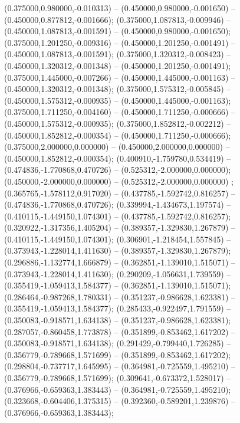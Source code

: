  (0.375000,0.980000,-0.010313) -- (0.450000,0.980000,-0.001650) -- (0.450000,0.877812,-0.001666);
 (0.375000,1.087813,-0.009946) -- (0.450000,1.087813,-0.001591) -- (0.450000,0.980000,-0.001650);
 (0.375000,1.201250,-0.009316) -- (0.450000,1.201250,-0.001491) -- (0.450000,1.087813,-0.001591);
 (0.375000,1.320312,-0.008423) -- (0.450000,1.320312,-0.001348) -- (0.450000,1.201250,-0.001491);
 (0.375000,1.445000,-0.007266) -- (0.450000,1.445000,-0.001163) -- (0.450000,1.320312,-0.001348);
 (0.375000,1.575312,-0.005845) -- (0.450000,1.575312,-0.000935) -- (0.450000,1.445000,-0.001163);
 (0.375000,1.711250,-0.004160) -- (0.450000,1.711250,-0.000666) -- (0.450000,1.575312,-0.000935);
 (0.375000,1.852812,-0.002212) -- (0.450000,1.852812,-0.000354) -- (0.450000,1.711250,-0.000666);
 (0.375000,2.000000,0.000000) -- (0.450000,2.000000,0.000000) -- (0.450000,1.852812,-0.000354);
 (0.400910,-1.759780,0.534419) -- (0.474836,-1.770868,0.470726) -- (0.525312,-2.000000,0.000000);
 (0.450000,-2.000000,0.000000) -- (0.525312,-2.000000,0.000000) ;
 (0.365765,-1.578112,0.917020) -- (0.437785,-1.592742,0.816257) -- (0.474836,-1.770868,0.470726);
 (0.339994,-1.434673,1.197574) -- (0.410115,-1.449150,1.074301) -- (0.437785,-1.592742,0.816257);
 (0.320922,-1.317356,1.405204) -- (0.389357,-1.329830,1.267879) -- (0.410115,-1.449150,1.074301);
 (0.306901,-1.218454,1.557845) -- (0.373943,-1.228014,1.411630) -- (0.389357,-1.329830,1.267879);
 (0.296886,-1.132774,1.666879) -- (0.362851,-1.139010,1.515071) -- (0.373943,-1.228014,1.411630);
 (0.290209,-1.056631,1.739559) -- (0.355419,-1.059413,1.584377) -- (0.362851,-1.139010,1.515071);
 (0.286464,-0.987268,1.780331) -- (0.351237,-0.986628,1.623381) -- (0.355419,-1.059413,1.584377);
 (0.285433,-0.922497,1.791559) -- (0.350083,-0.918571,1.634138) -- (0.351237,-0.986628,1.623381);
 (0.287057,-0.860458,1.773878) -- (0.351899,-0.853462,1.617202) -- (0.350083,-0.918571,1.634138);
 (0.291429,-0.799440,1.726285) -- (0.356779,-0.789668,1.571699) -- (0.351899,-0.853462,1.617202);
 (0.298804,-0.737717,1.645995) -- (0.364981,-0.725559,1.495210) -- (0.356779,-0.789668,1.571699);
 (0.309641,-0.673372,1.528017) -- (0.376966,-0.659363,1.383443) -- (0.364981,-0.725559,1.495210);
 (0.323668,-0.604406,1.375315) -- (0.392360,-0.589201,1.239876) -- (0.376966,-0.659363,1.383443);
